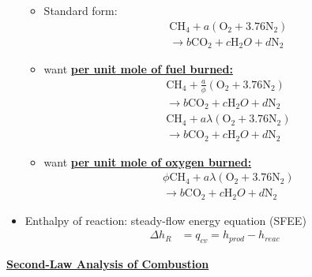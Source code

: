 \begin{itemize}
\begin{itemize}
        \item Standard form:
        \begin{align*}
            &\text{CH}_4 + a (\text{O}_2 + 3.76 \text{N}_2 ) \\
            &\rightarrow b \text{CO}_2 + c \text{H}_2 O + d \text{N}_2
        \end{align*}
        \item want \textbf{\ul{per unit mole of fuel burned:}}
        \begin{align*}
            &\text{CH}_4 + \frac{a}{\phi} (\text{O}_2 + 3.76 \text{N}_2 ) \\
            &\rightarrow b \text{CO}_2 + c \text{H}_2 O + d \text{N}_2 \\
            &\text{CH}_4 + a \lambda (\text{O}_2 + 3.76 \text{N}_2 ) \\
            &\rightarrow b \text{CO}_2 + c \text{H}_2 O + d \text{N}_2
        \end{align*}
        \item want \textbf{\ul{per unit mole of oxygen burned:}}
        \begin{align*}
            &\phi \text{CH}_4 + a \lambda (\text{O}_2 + 3.76 \text{N}_2 ) \\
            &\rightarrow b \text{CO}_2 + c \text{H}_2 O + d \text{N}_2
        \end{align*}
    \end{itemize}
    \item Enthalpy of reaction: steady-flow energy equation (SFEE)
    \begin{align*}
        \Delta h_R &= q_{cv} = h_{prod} - h_{reac}
    \end{align*}
\end{itemize}

{\Large \textbf{{\color{red}\underline{Second-Law Analysis of Combustion}}}}

